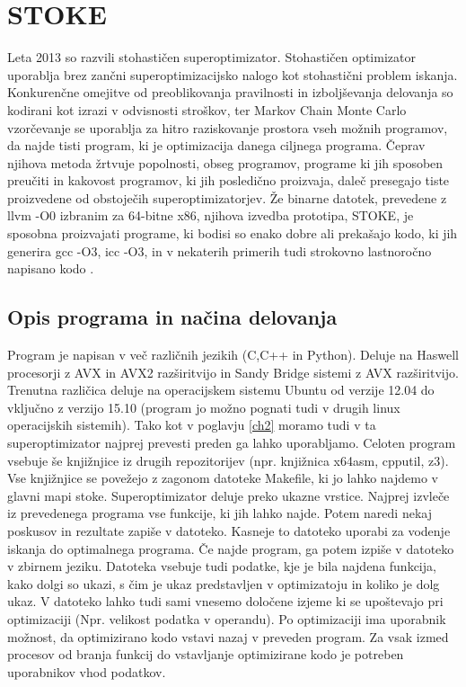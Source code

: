 \documentclass[a4paper, 12pt]{book}
\begin{document}
	\chapter{STOKE \cite{sup2}}
	Leta 2013 so razvili stohastičen superoptimizator. Stohastičen optimizator uporablja brez zančni superoptimizacijsko nalogo kot stohastični problem iskanja. Konkurenčne omejitve od preoblikovanja pravilnosti in izboljševanja delovanja so kodirani kot izrazi v odvisnosti stroškov, ter Markov Chain Monte Carlo vzorčevanje se uporablja za hitro raziskovanje prostora vseh možnih programov, da najde tisti program, ki je optimizacija danega ciljnega programa. Čeprav njihova metoda žrtvuje popolnosti, obseg programov, programe ki jih sposoben preučiti in kakovost programov, ki jih posledično proizvaja, daleč presegajo tiste proizvedene od obstoječih superoptimizatorjev. Že binarne datotek, prevedene z  llvm -O0 izbranim za 64-bitne x86, njihova izvedba prototipa, STOKE, je sposobna proizvajati programe, ki bodisi so enako dobre ali prekašajo kodo, ki jih generira gcc -O3, icc -O3, in v nekaterih primerih tudi strokovno lastnoročno napisano kodo \cite{article1,article5}.
	\section{Opis programa in načina delovanja}
	\label{lab1}
	Program je napisan v več različnih jezikih (C,C++ in Python). Deluje na Haswell procesorji z AVX in AVX2 razširitvijo in Sandy Bridge sistemi z AVX razširitvijo. Trenutna različica deluje na operacijskem sistemu Ubuntu od verzije 12.04 do vključno z verzijo 15.10 (program jo možno pognati tudi v drugih linux operacijskih sistemih). Tako kot v poglavju \ref{ch2} moramo tudi v ta superoptimizator najprej prevesti preden ga lahko uporabljamo. Celoten program vsebuje še knjižnjice iz drugih repozitorijev (npr. knjižnica x64asm, cpputil, z3). Vse knjižnjice se povežejo z zagonom datoteke Makefile, ki jo lahko najdemo v glavni mapi stoke. Superoptimizator deluje preko ukazne vrstice. Najprej izvleče iz prevedenega programa vse funkcije, ki jih lahko najde. Potem naredi nekaj poskusov in rezultate zapiše v datoteko. Kasneje to datoteko uporabi za vodenje iskanja do optimalnega programa. Če najde program, ga potem izpiše v datoteko v zbirnem jeziku. Datoteka vsebuje tudi podatke, kje je bila najdena funkcija, kako dolgi so ukazi, s čim je ukaz predstavljen v optimizatoju in koliko je dolg ukaz. V datoteko lahko tudi sami vnesemo določene izjeme ki se upoštevajo pri optimizaciji (Npr. velikost podatka v operandu). Po optimizaciji ima uporabnik možnost, da optimizirano kodo vstavi nazaj v preveden program. Za vsak izmed procesov od branja funkcij do vstavljanje optimizirane kodo je potreben uporabnikov vhod podatkov.
\end{document}
